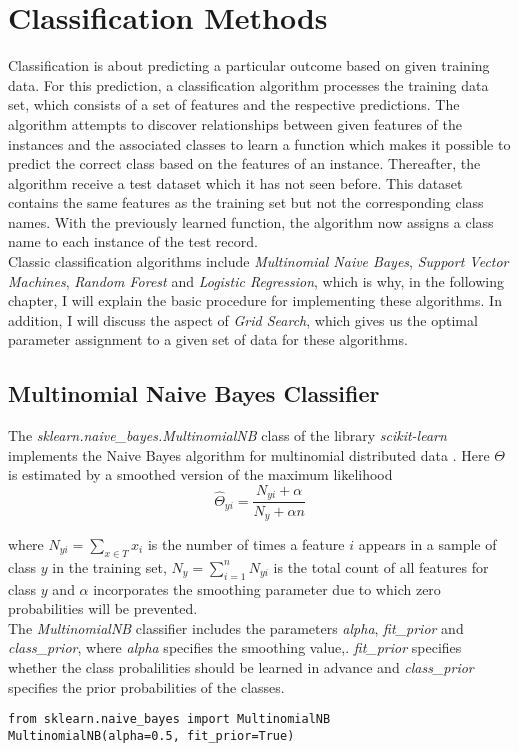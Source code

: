 \documentclass[a4paper, 11pt,titlepage,oneside,openany]{book}
\begin{document}
\section{Classification Methods}
Classification is about predicting a particular outcome based on given training data. For this prediction, a classification algorithm processes the training data set, which consists of a set of features and the respective predictions. The algorithm attempts to discover relationships between given features  of the instances and the associated classes to learn a function which makes it possible to predict the correct class based on the features of an instance. Thereafter, the algorithm receive a test dataset which it has not seen before. This dataset contains the same features as the training set but not the corresponding class names. With the previously learned function, the algorithm now assigns a class name to each instance  of the test record. \\
\noindent Classic classification algorithms include \textit{Multinomial Naive Bayes}, \textit{Support Vector Machines}, \textit{Random Forest} and \textit{Logistic Regression}, which is why, in the following chapter, I will explain the basic procedure for implementing these algorithms. In addition, I will discuss the aspect of \textit{Grid Search}, which gives us the optimal parameter assignment to a given set of data for these algorithms.
\subsection{Multinomial Naive Bayes Classifier}
The \textit{sklearn.naive\_bayes.MultinomialNB} class of the library \textit{scikit-learn} implements the Naive Bayes algorithm for multinomial distributed data \cite{codemulinomialnb}. Here $\Theta$ is estimated by a smoothed version of the maximum likelihood
\[
\hat{\Theta}_{yi}=\frac{N_{yi}+\alpha}{N_y + \alpha n}
\]

\noindent where $N_{yi}=\sum_{x \in T}x_i$ is the number of times a feature $i$ appears in a sample of class $y$ in the training set, $N_y=\sum_{i=1}^{n}N_{yi}$ is the total count of all features for class $y$ and $\alpha$ incorporates the smoothing parameter due to which zero probabilities will be prevented.
\\ The \textit{MultinomialNB} classifier includes the parameters \textit{alpha}, \textit{fit\_prior} and \textit{class\_prior}, where \textit{alpha} specifies the smoothing value,. \textit{fit\_prior} specifies whether the class probalilities should be learned in advance and \textit{class\_prior} specifies the prior probabilities of the classes.\\
\noindent
\begin{minipage}{\linewidth}
	\begin{lstlisting}
from sklearn.naive_bayes import MultinomialNB
MultinomialNB(alpha=0.5, fit_prior=True)
	\end{lstlisting}
\end{minipage} \\
\end{document}
